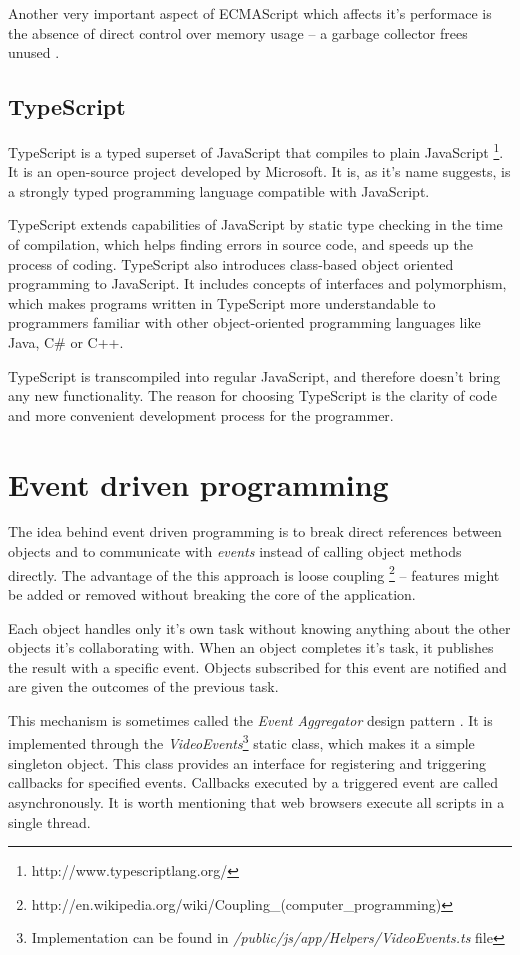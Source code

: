Another very important aspect of ECMAScript which affects it's performace is the absence of direct control over memory usage -- a garbage collector frees unused .

\subsection{TypeScript}
TypeScript is a typed superset of JavaScript that compiles to plain JavaScript\cite{} \footnote{http://www.typescriptlang.org/}. It is an open-source project developed by Microsoft. It is, as it's name suggests, is a strongly typed programming language compatible with JavaScript.

TypeScript extends capabilities of JavaScript by static type checking in the time of compilation, which helps finding errors in source code, and speeds up the process of coding. TypeScript also introduces class-based object oriented programming to JavaScript. It includes concepts of interfaces and polymorphism, which makes programs written in TypeScript more understandable to programmers familiar with other object-oriented programming languages like Java, C\# or C++.

TypeScript is transcompiled into regular JavaScript, and therefore doesn't bring any new functionality. The reason for choosing TypeScript is the clarity of code and more convenient development process for the programmer.

\section{Event driven programming}
The idea behind event driven programming is to break direct references between objects and to communicate with \textit{events} instead of calling object methods directly. The advantage of the this approach is loose coupling \footnote{http://en.wikipedia.org/wiki/Coupling\_(computer\_programming)} -- features might be added or removed without breaking the core of the application.

Each object handles only it's own task without knowing anything about the other objects it's collaborating with. When an object completes it's task, it publishes the result with a specific event. Objects subscribed for this event are notified and are given the outcomes of the previous task.

This mechanism is sometimes called the \textit{Event Aggregator} design pattern \cite{}. It is implemented through the \textit{VideoEvents}\footnote{Implementation can be found in \textit{/public/js/app/Helpers/VideoEvents.ts} file} static class, which makes it a simple singleton object. This class provides an interface for registering and triggering callbacks for specified events. Callbacks executed by a triggered event are called asynchronously. It is worth mentioning that web browsers execute all scripts in a single thread.

